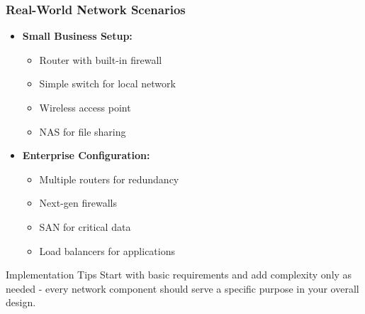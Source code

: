 \documentclass{beamer}
\begin{document}
\begin{frame}
    \frametitle{Real-World Network Scenarios}
    
    \begin{itemize}
        \item \textbf{Small Business Setup:}
        \begin{itemize}
            \item Router with built-in firewall
            \item Simple switch for local network
            \item Wireless access point
            \item NAS for file sharing
        \end{itemize}
        
        \item \textbf{Enterprise Configuration:}
        \begin{itemize}
            \item Multiple routers for redundancy
            \item Next-gen firewalls
            \item SAN for critical data
            \item Load balancers for applications
        \end{itemize}
    \end{itemize}
    
    \begin{alertblock}{Implementation Tips}
        Start with basic requirements and add complexity only as needed - every network component should serve a specific purpose in your overall design.
    \end{alertblock}
\end{frame}
\end{document}
